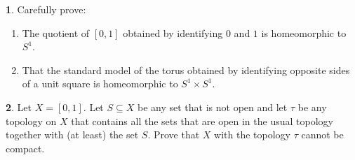 \documentclass[11pt]{article}
\theoremstyle{definition}
\newtheorem{problem}{}
\newcommand{\bp}{\begin{problem}}
\newcommand{\ep}{\end{problem}\bigskip}
\theoremstyle{theorem}
\begin{document}
\pagestyle{fancy}
\fancyfoot[R,C,L]{}

\newcommand{\Top}{\mathbf{Top}}
\newcommand{\Set}{\mathbf{Set}}
\newcommand{\N}{\mathbb{N}}

\bp Carefully prove:
\begin{enumerate}[label=(\alph*)]
\item The quotient of $[0,1]$ obtained by identifying $0$ and $1$ is homeomorphic to $S^1$.
\item That the standard model of the torus obtained by identifying opposite sides of a unit square is homeomorphic to $S^1\times S^1$.
\end{enumerate}
\ep

\bp Let $X=[0,1]$.  Let $S\subseteq X$ be any set that is not open and let $\tau$ be any topology on $X$ that contains all the sets that are open in the usual topology together with (at least) the set $S$.  Prove that $X$ with the topology $\tau$ cannot be compact.
\ep
\end{document}
